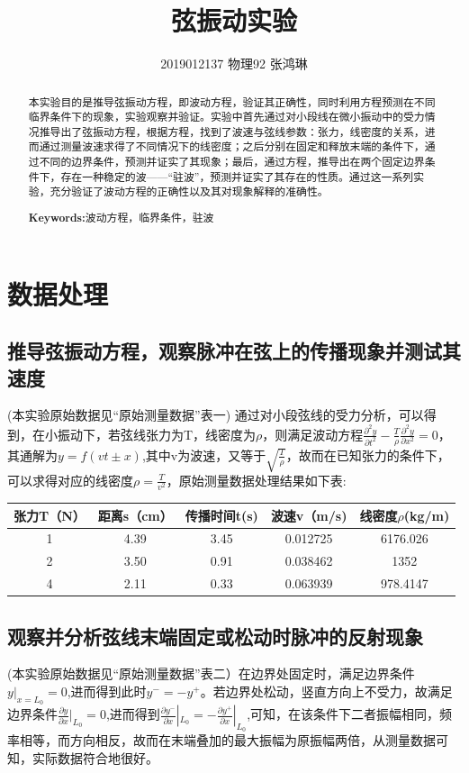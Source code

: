 \documentclass[UTF8]{ctexart}
\begin{document}
\title{弦振动实验}
\author{2019012137  物理92  张鸿琳}
\maketitle
\begin{abstract}

本实验目的是推导弦振动方程，即波动方程，验证其正确性，同时利用方程预测在不同临界条件下的现象，实验观察并验证。实验中首先通过对小段线在微小振动中的受力情况推导出了弦振动方程，根据方程，找到了波速与弦线参数：张力，线密度的关系，进而通过测量波速求得了不同情况下的线密度；之后分别在固定和释放末端的条件下，通过不同的边界条件，预测并证实了其现象；最后，通过方程，推导出在两个固定边界条件下，存在一种稳定的波——“驻波”，预测并证实了其存在的性质。通过这一系列实验，充分验证了波动方程的正确性以及其对现象解释的准确性。


\centering
\textbf{Keywords:}波动方程，临界条件，驻波
\end{abstract}

\newpage
\tableofcontents
\newpage
\section{数据处理}
\subsection{推导弦振动方程，观察脉冲在弦上的传播现象并测试其速度}
(本实验原始数据见“原始测量数据”表一)
通过对小段弦线的受力分析，可以得到，在小振动下，若弦线张力为T，线密度为$\rho$，则满足波动方程$\frac{\partial^2 y}{\partial t^2}-\frac{T}{\rho}\frac{\partial^2 y}{\partial x^2}=0$，其通解为$y=f(vt\pm x)$,其中v为波速，又等于$\sqrt{\frac{T}{\rho}}$，故而在已知张力的条件下，可以求得对应的线密度$\rho=\frac{T}{v^2}$，原始测量数据处理结果如下表:
\begin{table}[htbp!] 
\centering 
\begin{tabular}{|c|c|c|c|c|} 
\hline 
 张力T（N）&距离s（cm） &  传播时间t(s)&波速v（m/s)& 线密度$\rho$(kg/m)  \\ 
\hline 
 1&4.39&3.45&0.012725&6176.026  \\ 
\hline 
 2&3.50 &0.91&0.038462&1352\\ 
\hline 
 4&2.11&0.33&0.063939&978.4147 \\ 
\hline
\end{tabular} 
\end{table}

\subsection{观察并分析弦线末端固定或松动时脉冲的反射现象}
(本实验原始数据见“原始测量数据”表二）在边界处固定时，满足边界条件$y|_{x=L_0}=0$,进而得到此时$y^-=-y^+$。若边界处松动，竖直方向上不受力，故满足边界条件$\frac{\partial y}{\partial x}|_{L_0}=0$,进而得到$\frac{\partial y^-}{\partial x}|_{L_0}=-\frac{\partial y^+}{\partial x}|_{L_0}$,可知，在该条件下二者振幅相同，频率相等，而方向相反，故而在末端叠加的最大振幅为原振幅两倍，从测量数据可知，实际数据符合地很好。
\end{document}
